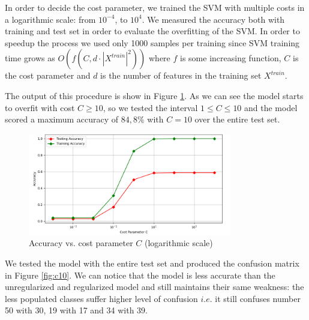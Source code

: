 \documentclass[compsoc]{IEEEtran}
\begin{document}
In order to decide the cost parameter, we trained the SVM with multiple costs in a logarithmic scale: from $10^{-4}$, to $10^{4}$. We measured the accuracy both with training and test set in order to evaluate the overfitting of the SVM. In order to speedup the process we used only 1000 samples per training since SVM training time grows as $O(f(C,  d \cdot |X^{train}|^2))$ where $f$ is some increasing function, $C$ is the cost parameter and $d$ is the number of features in the training set $X^{train}$.\par
The output of this procedure is show in  Figure \ref{fig:svmacc}. As we can see the model starts to overfit with cost $C \geq 10$, so we tested the interval $1 \leq C \leq 10$ and the model scored a maximum accuracy of $84,8\%$ with $C=10$ over the entire test set. 


\begin{figure}[ht!]
\centering                                                                        
\includegraphics[width=3.5in]{svmacc.png}
\captionsetup{justification=centering}                                                                                       
\caption{Accuracy vs. cost parameter $C$ (logarithmic scale)}
\label{fig:svmacc}
\end{figure}

We tested the model with the entire test set and produced the confusion matrix in Figure \ref{fig:c10}. We can notice that the model is less accurate than the unregularized and regularized model and still maintains their same weakness: the less populated classes suffer higher level of confusion $i.e.$ it still confuses number 50 with 30, 19 with 17 and 34 with 39.
\end{document}
